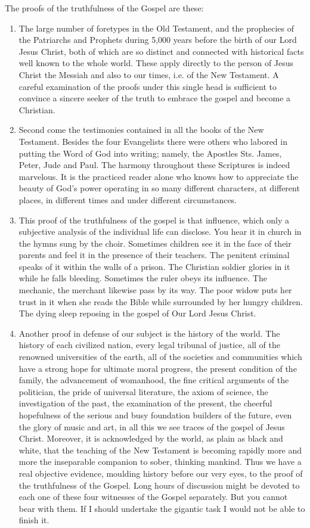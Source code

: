 The proofs of the truthfulness of the Gospel are these:
\begin{enumerate}
    \item The large number of foretypes in the Old Testament, and the prophecies of the Patriarchs and Prophets during 5,000 years before the birth of our Lord Jesus Christ, both of which are so distinct and connected with historical facts well known to the whole world. These apply directly to the person of Jesus Christ the Messiah and also to our times, i.e. of the New Testament. A careful examination of the proofs under this single head is sufficient to convince a sincere seeker of the truth to embrace the gospel and become a Christian.
    \item Second come the testimonies contained in all the books of the New Testament. Besides the four Evangelists there were others who labored in putting the Word of God into writing; namely, the Apostles Sts. James, Peter, Jude and Paul. The harmony throughout these Scriptures is indeed marvelous. It is the practiced reader alone who knows how to appreciate the beauty of God's power operating in so many different characters, at different places, in different times and under different circumstances.
    \item This proof of the truthfulness of the gospel is that influence, which only a subjective analysis of the individual life can disclose. You hear it in church in the hymns sung by the choir. Sometimes children see it in the face of their parents and feel it in the presence of their teachers. The penitent criminal speaks of it within the walls of a prison. The Christian soldier glories in it while he falls bleeding. Sometimes the ruler obeys its influence. The mechanic, the merchant likewise pass by its way. The poor widow puts her trust in it when she reads the Bible while surrounded by her hungry children. The dying sleep reposing in the gospel of Our Lord Jesus Christ.
    \item Another proof in defense of our subject is the history of the world. The history of each civilized nation, every legal tribunal of justice, all of the renowned universities of the earth, all of the societies and communities which have a strong hope for ultimate moral progress, the present condition of the family, the advancement of womanhood, the fine critical arguments of the politician, the pride of universal literature, the axiom of science, the investigation of the past, the examination of the present, the cheerful hopefulness of the serious and busy foundation builders of the future, even the glory of music and art, in all this we see traces of the gospel of Jesus Christ. Moreover, it is acknowledged by the world, as plain as black and white, that the teaching of the New Testament is becoming rapidly more and more the inseparable companion to sober, thinking mankind. Thus we have a real objective evidence, moulding history before our very eyes, to the proof of the truthfulness of the Gospel. Long hours of discussion might be devoted to each one of these four witnesses of the Gospel separately. But you cannot bear with them. If I should undertake the gigantic task I would not be able to finish it.

\end{enumerate}
